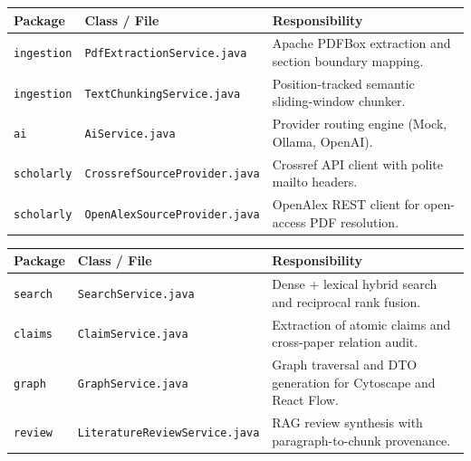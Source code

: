 \documentclass[11pt,a4paper,titlepage]{report}
\begin{document}
\begin{center}
\label{tab:code_ingestion}
\vspace{3pt}
\begin{tabularx}{\textwidth}{llX}
\toprule
\textbf{Package} & \textbf{Class / File} & \textbf{Responsibility} \\
\midrule
\texttt{ingestion} & \texttt{PdfExtractionService.java} & Apache PDFBox extraction and section boundary mapping. \\
\texttt{ingestion} & \texttt{TextChunkingService.java} & Position-tracked semantic sliding-window chunker. \\
\texttt{ai} & \texttt{AiService.java} & Provider routing engine (Mock, Ollama, OpenAI). \\
\texttt{scholarly} & \texttt{CrossrefSourceProvider.java} & Crossref API client with polite mailto headers. \\
\texttt{scholarly} & \texttt{OpenAlexSourceProvider.java} & OpenAlex REST client for open-access PDF resolution. \\
\bottomrule
\end{tabularx}
\end{center}

\begin{center}
\label{tab:code_services}
\vspace{3pt}
\begin{tabularx}{\textwidth}{llX}
\toprule
\textbf{Package} & \textbf{Class / File} & \textbf{Responsibility} \\
\midrule
\texttt{search} & \texttt{SearchService.java} & Dense + lexical hybrid search and reciprocal rank fusion. \\
\texttt{claims} & \texttt{ClaimService.java} & Extraction of atomic claims and cross-paper relation audit. \\
\texttt{graph} & \texttt{GraphService.java} & Graph traversal and DTO generation for Cytoscape and React Flow. \\
\texttt{review} & \texttt{LiteratureReviewService.java} & RAG review synthesis with paragraph-to-chunk provenance. \\
\bottomrule
\end{tabularx}
\end{center}
\end{document}
